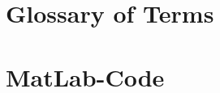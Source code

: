 
\newpage



\clearpage

\begin{appendices}
	
	\setlength{\glspagelistwidth}{\textwidth}
	\setlength{\glsdescwidth}{0.85\textwidth}

	\renewcommand*{\arraystretch}{1.2}	%
	
		
	\setlength{\glspagelistwidth}{\textwidth}
	\setlength{\glsdescwidth}{0.75\textwidth}

	\renewcommand*{\arraystretch}{1.5}
	\chapter{Glossary of Terms}	\label{cha:Glossary_of_Terms}
	
	\printglossary[type=terminology,style=altsuper4col]
	
	\chapter{MatLab-Code} \label{cha:MatLab_Code}
	

\end{appendices}
